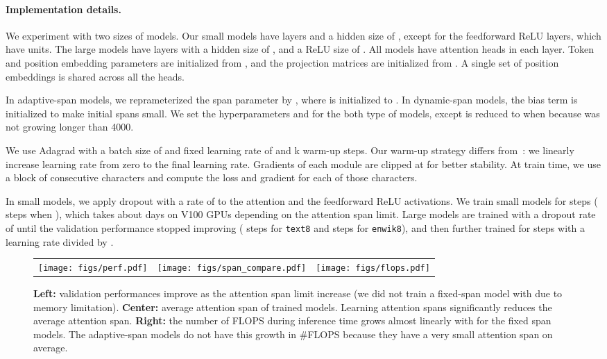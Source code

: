 \documentclass[11pt,a4paper]{article}
\begin{document}
\paragraph{Implementation details.}
We experiment with two sizes of models.
Our small models have  layers and a hidden size of , except for the feedforward ReLU layers, which have  units.
The large models have  layers with a hidden size of , and a ReLU size of . All models have  attention heads in each layer.
Token and position embedding parameters are initialized from , and the projection matrices  are initialized from .
A single set of position embeddings  is shared across all the heads.

In adaptive-span models, we reprameterized the span parameter  by , where  is initialized to . In dynamic-span models, the bias term  is initialized  to make initial spans small.
We set the hyperparameters  and  for the both type of models, except  is reduced to  when  because  was not growing longer than 4000.

We use Adagrad with a batch size of  and fixed learning rate of  and k warm-up steps.
Our warm-up strategy differs from~\citet{vaswani2017attention}: we linearly increase learning rate from zero to the final learning rate.
Gradients of each module are clipped at  for better stability.
At train time, we use a block of  consecutive characters and compute the loss and gradient for each of those  characters.

In small models, we apply dropout with a rate of  to the attention and the feedforward ReLU activations.
We train small models for  steps ( steps when ), which takes about  days on  V100 GPUs depending on the attention span limit.
Large models are trained with a dropout rate of  until the validation performance stopped improving ( steps for \texttt{text8} and  steps for \texttt{enwik8}), and then further trained for  steps with a learning rate divided by .

\begin{figure*}[t]
\centering
  \begin{tabular}{lcr}
    \texttt{[image: figs/perf.pdf]}&
    \texttt{[image: figs/span\_compare.pdf]}&
    \texttt{[image: figs/flops.pdf]}
  \end{tabular}
  \vspace{-4mm}
  \caption{\textbf{Left:} validation performances improve as the attention span limit  increase (we did not train a fixed-span model with  due to memory limitation).
  \textbf{Center:} average attention span of trained models. Learning attention spans significantly reduces the average attention span.
  \textbf{Right:} the number of FLOPS during inference time grows almost linearly with  for the fixed span models. The adaptive-span models do not have this growth in \#FLOPS because they have a very small attention span on average.}
\label{fig:perf}
\end{figure*}
\end{document}
